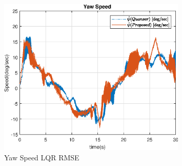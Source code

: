 \documentclass[fontsize=11pt, %
                             paper=letter, %
                             openany, %
                             captions=tableheading,
                             index=totoc,
                             hyperref]{labbook}
\begin{document}
\begin{addmargin}[0cm]{0cm}
\begin{figure}
  \centering
  \includegraphics[width=0.8\textwidth]{figs/img/02262019/YawSpeed_LQR_RMSE.eps}
  \caption{Yaw Speed LQR RMSE}
  \label{fig:YawSpeed_LQR_RMSE}
\end{figure}


\end{addmargin}
\end{document}
